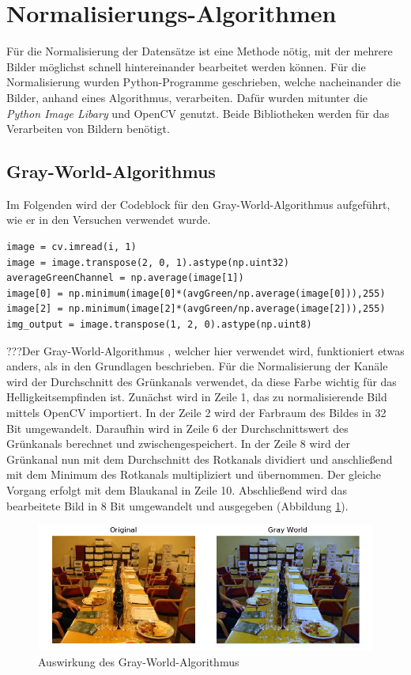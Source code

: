 \section{Normalisierungs-Algorithmen}\label{s.nalgorithmen}
Für die Normalisierung der Datensätze ist eine Methode nötig, mit der mehrere Bilder möglichst schnell hintereinander bearbeitet werden können. Für die Normalisierung wurden Python-Programme geschrieben, welche nacheinander die Bilder, anhand eines Algorithmus, verarbeiten. Dafür wurden mitunter die \textit{Python Image Libary} und OpenCV genutzt. Beide Bibliotheken werden für das Verarbeiten von Bildern benötigt. 
\newpage
\subsection{Gray-World-Algorithmus} 
Im Folgenden wird der Codeblock für den Gray-World-Algorithmus aufgeführt, wie er in den Versuchen verwendet wurde.\\
\begin{lstlisting}
image = cv.imread(i, 1)
image = image.transpose(2, 0, 1).astype(np.uint32)
averageGreenChannel = np.average(image[1])
image[0] = np.minimum(image[0]*(avgGreen/np.average(image[0])),255)
image[2] = np.minimum(image[2]*(avgGreen/np.average(image[2])),255)
img_output = image.transpose(1, 2, 0).astype(np.uint8)
\end{lstlisting}
???Der Gray-World-Algorithmus \cite{gray2012world}, welcher hier verwendet wird, funktioniert etwas anders, als in den Grundlagen beschrieben. Für die Normalisierung der Kanäle wird der Durchschnitt des Grünkanals verwendet, da diese Farbe wichtig für das Helligkeitsempfinden ist. Zunächst wird in Zeile 1, das zu normalisierende Bild mittels OpenCV importiert. In der Zeile 2 wird der Farbraum des Bildes in 32 Bit umgewandelt. Daraufhin wird in Zeile 6 der Durchschnittswert des Grünkanals berechnet und zwischengespeichert. In der Zeile 8 wird der Grünkanal nun mit dem Durchschnitt des Rotkanals dividiert und anschließend mit dem Minimum des Rotkanals multipliziert und übernommen. Der gleiche Vorgang erfolgt mit dem Blaukanal in Zeile 10. Abschließend wird das bearbeitete Bild in 8 Bit umgewandelt und ausgegeben (Abbildung \ref{img:gwnimg}). 
\begin{figure}
	[h]
	\centering
	\includegraphics[scale=0.6]{Sources/gwn.png}
	\caption{Auswirkung des Gray-World-Algorithmus}
	\label{img:gwnimg}
\end{figure}
\newpage
